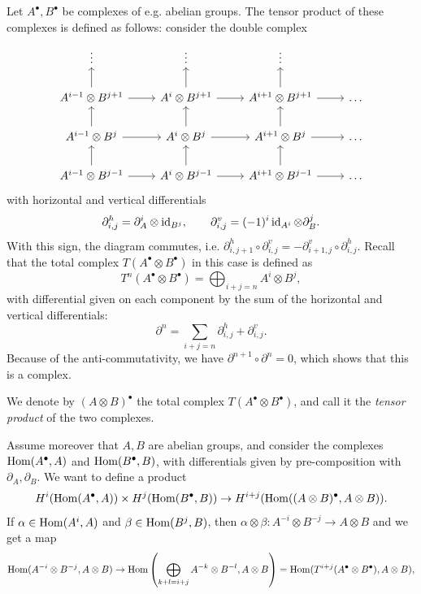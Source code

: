 \documentclass{article}
\begin{document}
\begin{constr}
		Let $A^\bullet,B^\bullet$ be complexes of e.g. abelian groups. The tensor product of these complexes is defined as follows: consider the double complex
		\[
			\begin{tikzcd}
				\vdots & \vdots & \vdots & \\
				A^{i-1}\otimes B^{j+1} \arrow[r] \arrow[u] & A^{i}\otimes B^{j+1} \arrow[r] \arrow[u] & A^{i+1}\otimes B^{j+1} \arrow[r] \arrow[u] & \ldots \\
				A^{i-1}\otimes B^{j} \arrow[r] \arrow[u] & A^{i}\otimes B^{j} \arrow[r] \arrow[u] & A^{i+1}\otimes B^{j} \arrow[r] \arrow[u] & \ldots \\
				A^{i-1}\otimes B^{j-1} \arrow[r] \arrow[u] & A^{i}\otimes B^{j-1} \arrow[r] \arrow[u] & A^{i+1}\otimes B^{j-1} \arrow[r] \arrow[u] & \ldots
			\end{tikzcd}
		\]
		with horizontal and vertical differentials
		\[
			\partial^h_{i,j} = \partial_A^i\otimes\operatorname{id}_{B^j},\qquad \partial^v_{i,j} = (-1)^i\operatorname{id}_{A^i}\otimes\partial_B^j.
		\]
		With this sign, the diagram commutes, i.e. $\partial^h_{i,j+1}\circ\partial^v_{i,j} =-\partial^v_{i+1,j}\circ\partial^h_{i,j}$. Recall that the total complex $T(A^\bullet\otimes B^\bullet)$ in this case is defined as
		\[
			T^n(A^\bullet\otimes B^\bullet) = \bigoplus_{i+j=n} A^i\otimes B^j,	
		\]
		with differential given on each component by the sum of the horizontal and vertical differentials:
		\[
			\partial^n = \sum_{i+j=n} \partial^h_{i,j} + \partial^v_{i,j}.
		\]
		Because of the anti-commutativity, we have $\partial^{n+1}\circ\partial^n=0$, which shows that this is a complex.
		\begin{defn}
				We denote by $(A\otimes B)^\bullet$ the total complex $T(A^\bullet\otimes B^\bullet)$, and call it the \emph{tensor product} of the two complexes.
		\end{defn}
		Assume moreover that $A,B$ are abelian groups, and consider the complexes $\operatorname{Hom}(A^\bullet,A)$ and $\operatorname{Hom}(B^\bullet,B)$, with differentials given by pre-composition with $\partial_A,\partial_B$. We want to define a product
		\[
				H^i(\operatorname{Hom}(A^\bullet,A))\times H^j(\operatorname{Hom}(B^\bullet,B)) \to H^{i+j}(\operatorname{Hom}((A\otimes B)^\bullet,A\otimes B)).
				\]
		If $\alpha\in \operatorname{Hom}(A^i,A)$ and $\beta\in \operatorname{Hom}(B^j,B)$, then $\alpha\otimes\beta: A^{-i}\otimes B^{-j}\to A\otimes B$ and we get a map
		\[
				\operatorname{Hom}(A^{-i}\otimes B^{-j},A\otimes B) \to \operatorname{Hom}\left(\bigoplus_{k+l=i+j} A^{-k}\otimes B^{-l},A\otimes B\right) = \operatorname{Hom}(T^{i+j}(A^\bullet\otimes B^\bullet),A\otimes B),
\]
\end{constr}
\end{document}
